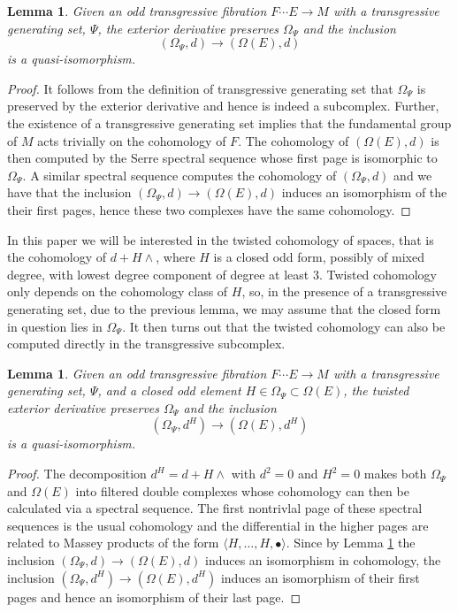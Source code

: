 \documentclass[12pt,twoside]{article}
\theoremstyle{plain}
\newtheorem{lemma}[theorem]{Lemma}%
\theoremstyle{definition}
\newcommand{\IP}[1]{\langle #1 \rangle}
\numberwithin{equation}{section}
\begin{document}
\begin{lemma}\label{lem:quasi-iso1}
Given an odd transgressive fibration $F\cdots E \to M$ with a transgressive generating set, $\Psi$, the exterior derivative preserves $\Omega_\Psi$ and the inclusion
\[ (\Omega_\Psi,d) \to (\Omega(E),d)\]
is a quasi-isomorphism. 
\end{lemma}
\begin{proof}
It follows from the definition of transgressive generating set that $\Omega_\Psi $ is preserved by the exterior derivative and hence is indeed a subcomplex. Further, the existence of a transgressive generating set implies that the fundamental group of $M$ acts trivially on the cohomology of $F$.  The cohomology of  $(\Omega(E),d)$ is then computed by the Serre spectral sequence whose first page is isomorphic to $\Omega_{\Psi}$. A similar spectral sequence computes the cohomology of $(\Omega_\Psi,d)$ and we have that the inclusion $(\Omega_\Psi,d) \to (\Omega(E),d)$ induces an isomorphism of the their first pages, hence these two complexes have the same cohomology.
\end{proof}

In this paper we will be interested in the twisted cohomology of spaces, that is the cohomology of $d+H\wedge$, where $H$ is a closed odd form, possibly of mixed degree, with lowest degree component of degree at least 3. Twisted cohomology only depends on the cohomology class of $H$, so, in the presence of a transgressive generating set, due to the previous lemma, we may assume that the closed form in question lies in $\Omega_\Psi$. It then turns out that the twisted cohomology can also be computed directly in the transgressive subcomplex.

\begin{lemma}
Given an odd transgressive fibration $F\cdots E \to M$ with a transgressive generating set, $\Psi$, and a closed odd element $H \in \Omega_{\Psi} \subset \Omega(E)$, the twisted exterior derivative preserves $\Omega_\Psi$ and the inclusion
\[ (\Omega_\Psi,d^H) \to (\Omega(E),d^H)\]
is a quasi-isomorphism. 
\end{lemma}
\begin{proof}
The decomposition $d^H = d + H\wedge$ with $d^2 =0$ and $H^2=0$ makes both $\Omega_\Psi$ and $\Omega(E)$ into filtered double complexes whose cohomology can then be calculated via a spectral sequence. The first nontrivlal page of these spectral sequences is the usual cohomology and the differential in the higher pages are related to Massey products of the form $\IP{H,\dots,H,\bullet}$. Since by Lemma \ref{lem:quasi-iso1} the inclusion $(\Omega_\Psi,d) \to (\Omega(E),d)$ induces an isomorphism in cohomology, the inclusion $(\Omega_\Psi,d^H) \to (\Omega(E),d^H)$ induces an isomorphism of their first pages and hence an isomorphism of their last page.
\end{proof}
\end{document}
